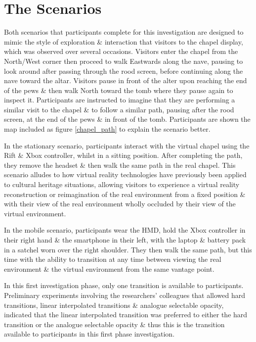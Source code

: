 \documentclass[oneside]{book}
\begin{document}
\section{The Scenarios}
Both scenarios that participants complete for this investigation are designed to mimic the style of exploration \& interaction that visitors to the chapel display, which was observed over several occasions. Visitors enter the chapel from the North/West corner then proceed to walk Eastwards along the nave, pausing to look around after passing through the rood screen, before continuing along the nave toward the altar. Visitors pause in front of the alter upon reaching the end of the pews \& then walk North toward the tomb where they pause again to inspect it. Participants are instructed to imagine that they are performing a similar visit to the chapel \& to follow a similar path, pausing after the rood screen, at the end of the pews \& in front of the tomb. Participants are shown the map included as figure \ref{chapel_path} to explain the scenario better.

In the stationary scenario, participants interact with the virtual chapel using the Rift \& Xbox controller, whilst in a sitting position. After completing the path, they remove the headset \& then walk the same path in the real chapel. This scenario alludes to how virtual reality technologies have previously been applied to cultural heritage situations, allowing visitors to experience a virtual reality reconstruction or reimagination of the real environment from a fixed position \& with their view of the real environment wholly occluded by their view of the virtual environment.

In the mobile scenario, participants wear the HMD, hold the Xbox controller in their right hand \& the smartphone in their left, with the laptop \& battery pack in a satchel worn over the right shoulder. They then walk the same path, but this time with the ability to transition at any time between viewing the real environment \& the virtual environment from the same vantage point.

In this first investigation phase, only one transition is available to participants. Preliminary experiments involving the researchers' colleagues that allowed hard transitions, linear interpolated transitions \& analogue selectable opacity, indicated that the linear interpolated transition was preferred to either the hard transition or the analogue selectable opacity \& thus this is the transition available to participants in this first phase investigation.
\end{document}
